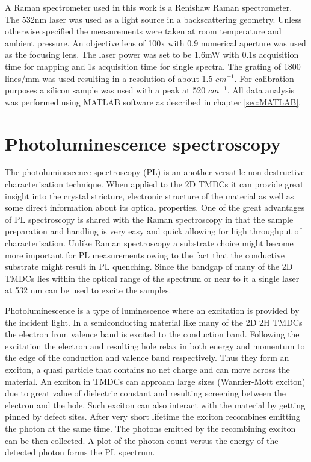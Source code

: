 A Raman spectrometer used in this work is a Renishaw Raman spectrometer. The 532nm laser was used as a light source in a backscattering geometry. Unless otherwise specified the measurements were taken at room temperature and ambient pressure. An objective lens of 100x with 0.9 numerical aperture was used as the focusing lens. The laser power was set to be 1.6mW with 0.1s acquisition time for mapping and 1s acquisition time for single spectra. The grating of 1800 lines/mm was used resulting in a resolution of about 1.5 $cm^{-1}$. For calibration purposes a silicon sample was used with a peak at 520 $cm^{-1}$. All data analysis was performed using MATLAB software as described in chapter \ref{sec:MATLAB}.

\section{Photoluminescence spectroscopy}

The photoluminescence spectroscopy (PL) is an another versatile non-destructive characterisation technique. When applied to the 2D TMDCs it can provide great insight into the crystal stricture, electronic structure of the material as well as some direct information about its optical properties. One of the great advantages of PL spectroscopy is shared with the Raman spectroscopy in that the sample preparation and handling is very easy and quick allowing for high throughput of characterisation. Unlike Raman spectroscopy a substrate choice might become more important for PL measurements owing to the fact that the conductive substrate might result in PL quenching. Since the bandgap of many of the 2D TMDCs lies within the optical range of the spectrum or near to it a single laser at 532 nm can be used to excite the samples.

Photoluminescence is a type of luminescence where an excitation is provided by the incident light. In a semiconducting material like many of the 2D 2H TMDCs the electron from valence band is excited to the conduction band. Following the excitation the electron and resulting hole relax in both energy and momentum to the edge of the conduction and valence band respectively. Thus they form an exciton, a quasi particle that contains no net charge and can move across the material. An exciton in TMDCs can approach large sizes (Wannier-Mott exciton) due to great value of dielectric constant and resulting screening between the electron and the hole. Such exciton can also interact with the material by getting pinned by defect sites. After very short lifetime the exciton recombines emitting the photon at the same time. The photons emitted by the recombining exciton can be then collected. A plot of the photon count versus the energy of the detected photon forms the PL spectrum.

